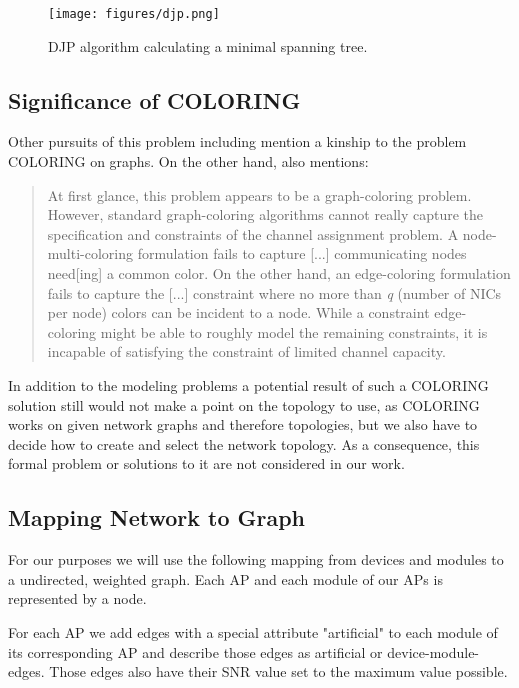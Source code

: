     \begin{figure}[th!]
      \centering
      \texttt{[image: figures/djp.png]}
      \caption{\ac{DJP} algorithm calculating a minimal spanning tree.}
      \label{fig:djp}
    \end{figure}
    
  \subsection{Significance of COLORING}
    Other pursuits of this problem including \cite{katzela, BFS-CA, caa_tricky, CTA} mention a kinship to the problem COLORING on graphs.
    On the other hand, \cite{caa_tricky} also mentions:
    
    \begin{quote}
      At first glance, this problem appears to be a graph-coloring problem. However, standard graph-coloring algorithms cannot really capture the specification and constraints 
      of the channel assignment problem. A node-multi-coloring formulation fails to capture [...] communicating nodes need[ing] a common color. On the other hand,
      an edge-coloring formulation fails to capture the [...] constraint where no more than \textit{q} (number of NICs per node) colors can be incident to a node.
      While a constraint edge-coloring might be able to roughly model the remaining constraints, it is incapable of satisfying the constraint of limited channel capacity.
    \end{quote}
    
    In addition to the modeling problems a potential result of such a COLORING solution still would not make a point on the topology to use,
    as COLORING works on given network graphs and therefore topologies, but we also have to decide how to create and select the network topology.
    As a consequence, this formal problem or solutions to it are not considered in our work.
    
  \subsection{Mapping Network to Graph}
    For our purposes we will use the following mapping from devices and modules to a undirected, weighted graph.
    Each \ac{AP} and each module of our APs is represented by a node.
    
    For each \ac{AP} we add edges with a special attribute "artificial" 
    to each module of its corresponding \ac{AP} and describe those edges as artificial or device-module-edges.
    Those edges also have their \ac{SNR} value set to the maximum value possible. 
    
